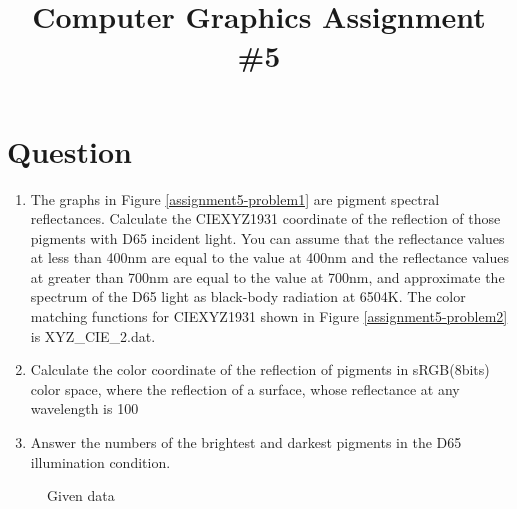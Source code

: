 

\usepackage{subfiles}
\usepackage{subcaption}
\usepackage{hyperref}

\title{Computer Graphics Assignment \#5}

\section{Question}
\begin{enumerate}
    \item The graphs in Figure \ref{assignment5-problem1} are pigment spectral reflectances. Calculate the CIEXYZ1931 coordinate of the reflection of those pigments with D65 incident light. You can assume that the reflectance values at less than 400nm are equal to the value at 400nm and the reflectance values at greater than 700nm are equal to the value at 700nm, and approximate the spectrum of the D65 light as black-body radiation at 6504K. The color matching functions for CIEXYZ1931 shown in Figure \ref{assignment5-problem2} is XYZ\_CIE\_2.dat.
    \item Calculate the color coordinate of the reflection of pigments in sRGB(8bits) color space, where the reflection of a surface, whose reflectance at any wavelength is 100%
    \item Answer the numbers of the brightest and darkest pigments in the D65 illumination condition.
\end{enumerate}

\begin{figure}[h]
    \centering
    \hspace*{\fill}
    \hspace*{\fill}
    \hspace*{\fill}
    \caption{Given data}
\end{figure}

